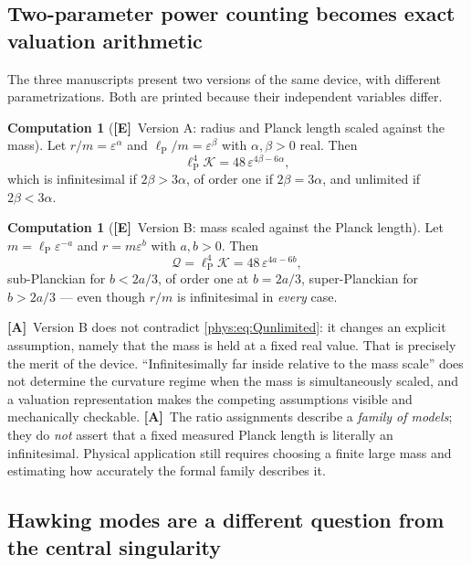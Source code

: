 \documentclass[11pt,letterpaper]{article}
\numberwithin{equation}{section}
\theoremstyle{definition}
\newtheorem{computation}[theorem]{Computation}
\theoremstyle{remark}
\newcommand{\eps}{\varepsilon}
\newcommand{\Kret}{\mathcal K}
\newcommand{\lP}{\ell_{\mathrm P}}
\newcommand{\TE}{\textcolor{TierE}{\textsf{\bfseries[E]}}}
\newcommand{\TA}{\textcolor{TierA}{\textsf{\bfseries[A]}}}
\begin{document}
\subsection{Two-parameter power counting becomes exact valuation arithmetic}
\label{phys:sub:twoscale}

The three manuscripts present two versions of the same device, with different
parametrizations. Both are printed because their independent variables differ.

\begin{computation}[\TE\ Version A: radius and Planck length scaled against
the mass]
\label{phys:comp:twoscaleA}
Let $r/m=\eps^{\alpha}$ and $\lP/m=\eps^{\beta}$ with $\alpha,\beta>0$ real.
Then
\begin{equation}\label{phys:eq:EFTvaluation}
\lP^{4}\Kret=48\,\eps^{4\beta-6\alpha},
\end{equation}
which is infinitesimal if $2\beta>3\alpha$, of order one if $2\beta=3\alpha$,
and unlimited if $2\beta<3\alpha$.
\end{computation}

\begin{computation}[\TE\ Version B: mass scaled against the Planck length]
\label{phys:comp:twoscaleB}
Let $m=\lP\eps^{-a}$ and $r=m\eps^{b}$ with $a,b>0$. Then
\begin{equation}\label{phys:eq:twoscale}
\mathcal Q=\lP^{4}\Kret=48\,\eps^{4a-6b},
\end{equation}
sub-Planckian for $b<2a/3$, of order one at $b=2a/3$, super-Planckian for
$b>2a/3$ --- even though $r/m$ is infinitesimal in \emph{every} case.
\end{computation}

\TA\ Version B does not contradict \eqref{phys:eq:Qunlimited}: it changes an
explicit assumption, namely that the mass is held at a fixed real value. That
is precisely the merit of the device. ``Infinitesimally far inside relative to
the mass scale'' does not determine the curvature regime when the mass is
simultaneously scaled, and a valuation representation makes the competing
assumptions visible and mechanically checkable. \TA\ The ratio assignments
describe a \emph{family of models}; they do \emph{not} assert that a fixed
measured Planck length is literally an infinitesimal. Physical application
still requires choosing a finite large mass and estimating how accurately the
formal family describes it.

\subsection{Hawking modes are a different question from the central singularity}
\label{phys:sub:hawkingmodes}
\end{document}

